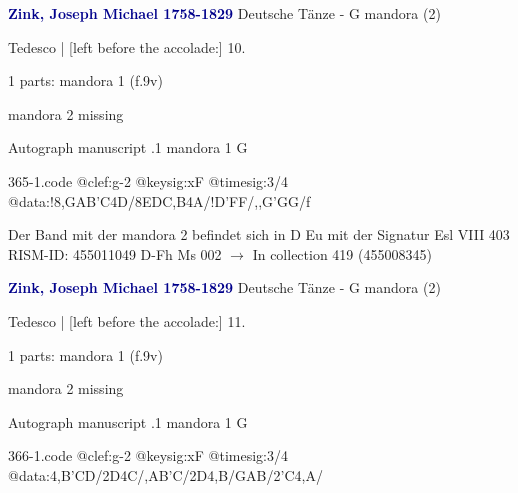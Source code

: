 \documentclass[twocolumn]{book}
\begin{document}
\newline \par \vspace{7pt} \textcolor{darkblue}{\textbf{Zink, Joseph Michael  1758-1829}}
\newline Deutsche Tänze - G
\newline mandora (2)
\newline \begin{itshape}[f.9v, at left:] Tedesco | [left before the accolade:] 10.\end{itshape} 
\newline \textcolor{darkblue}{}  1 parts: mandora 1  (f.9v)
\newline \begin{small} mandora 2 missing\end{small} 
\newline Autograph manuscript
.1  mandora 1  G  
\begin{filecontents*}{365-1.code}
@clef:g-2
@keysig:xF
@timesig:3/4
@data:!{8,GAB'C}4D/{8EDC,B}4A/!D'FF/,,G'GG/f
\end{filecontents*}
\newline
%

\newline Der Band mit der mandora 2 befindet sich in D Eu mit der Signatur Esl VIII 403
\newline RISM-ID: 455011049
\newline D-Fh  Ms 002
\newline $\rightarrow$ In collection 419 (455008345)
      
\newline \par \vspace{7pt} \textcolor{darkblue}{\textbf{Zink, Joseph Michael  1758-1829}}
\newline Deutsche Tänze - G
\newline mandora (2)
\newline \begin{itshape}[f.9v, at left:] Tedesco | [left before the accolade:] 11.\end{itshape} 
\newline \textcolor{darkblue}{}  1 parts: mandora 1  (f.9v)
\newline \begin{small} mandora 2 missing\end{small} 
\newline Autograph manuscript
.1  mandora 1  G  
\begin{filecontents*}{366-1.code}
@clef:g-2
@keysig:xF
@timesig:3/4
@data:4,B'CD/2D4C/,AB'C/2D4,B/GAB/2'C4,A/
\end{filecontents*}
\newline
%
\end{document}
